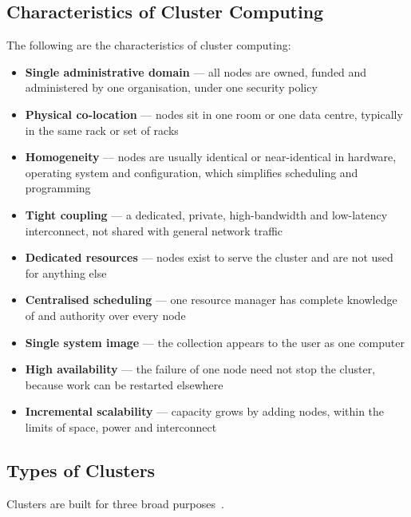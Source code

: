 \documentclass[../main.tex]{subfiles}
\begin{document}
\subsection{Characteristics of Cluster Computing}
The following are the characteristics of cluster computing:
\begin{itemize}
  \item \textbf{Single administrative domain} --- all nodes are owned, funded
        and administered by one organisation, under one security policy
  \item \textbf{Physical co-location} --- nodes sit in one room or one data
        centre, typically in the same rack or set of racks
  \item \textbf{Homogeneity} --- nodes are usually identical or near-identical
        in hardware, operating system and configuration, which simplifies
        scheduling and programming
  \item \textbf{Tight coupling} --- a dedicated, private, high-bandwidth and
        low-latency interconnect, not shared with general network traffic
  \item \textbf{Dedicated resources} --- nodes exist to serve the cluster and
        are not used for anything else
  \item \textbf{Centralised scheduling} --- one resource manager has complete
        knowledge of and authority over every node
  \item \textbf{Single system image} --- the collection appears to the user as
        one computer
  \item \textbf{High availability} --- the failure of one node need not stop
        the cluster, because work can be restarted elsewhere
  \item \textbf{Incremental scalability} --- capacity grows by adding nodes,
        within the limits of space, power and interconnect
\end{itemize}

\subsection{Types of Clusters}

Clusters are built for three broad purposes~.
\end{document}
